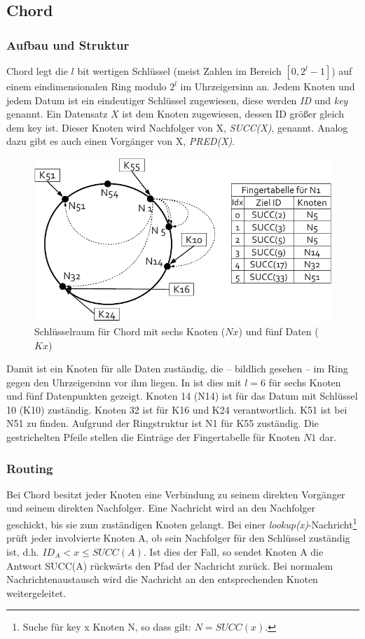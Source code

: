 \subsection{Chord}
\label{chap:evaluation_chord}

\subsubsection{Aufbau und Struktur}
Chord \cite{Stoica2003} legt die $l$ bit wertigen Schlüssel (meist Zahlen im Bereich $[0,2^l-1]$) auf einem eindimensionalen Ring modulo $2^l$ im Uhrzeigersinn an. Jedem Knoten und jedem Datum ist ein eindeutiger Schlüssel zugewiesen, diese werden \emph{ID} und \emph{key} genannt. Ein Datensatz $X$ ist dem Knoten zugewiesen, dessen ID größer gleich dem key ist. Dieser Knoten wird Nachfolger von X, \emph{SUCC(X)}, genannt. Analog dazu gibt es auch einen Vorgänger von X, \emph{PRED(X)}.

\begin{figure}[htbp]
\centering
\includegraphics{grafics/chord_key_space.pdf}
\caption{Schlüsselraum für Chord mit sechs Knoten ($Nx$) und fünf Daten ($Kx$)}
\label{fig:chord_key_space}
\end{figure}

Damit ist ein Knoten für alle Daten zuständig, die -- bildlich gesehen -- im Ring gegen den Uhrzeigersinn vor ihm liegen. In  ist dies mit $l=6$ für sechs Knoten und fünf Datenpunkten gezeigt. Knoten 14 (N14) ist für das Datum mit Schlüssel 10 (K10) zuständig. Knoten 32 ist für K16 und K24 verantwortlich. K51 ist bei N51 zu finden. Aufgrund der Ringstruktur ist N1 für K55 zuständig. Die gestrichelten Pfeile stellen die Einträge der Fingertabelle für Knoten $N1$ dar. 

\subsubsection{Routing}
Bei Chord besitzt jeder Knoten eine Verbindung zu seinem direkten Vorgänger und seinem direkten Nachfolger. Eine Nachricht wird an den Nachfolger geschickt, bis sie zum zuständigen Knoten gelangt. Bei einer \emph{lookup(x)}-Nachricht\footnote{Suche für key x Knoten N, so dass gilt: $N = SUCC(x)$.} prüft jeder involvierte Knoten A, ob sein Nachfolger für den Schlüssel zuständig ist, d.h. $ID_A < x \le SUCC(A)$. Ist dies der Fall, so sendet Knoten A die Antwort SUCC(A) rückwärts den Pfad der Nachricht zurück. Bei normalem Nachrichtenaustausch wird die Nachricht an den entsprechenden Knoten weitergeleitet.

